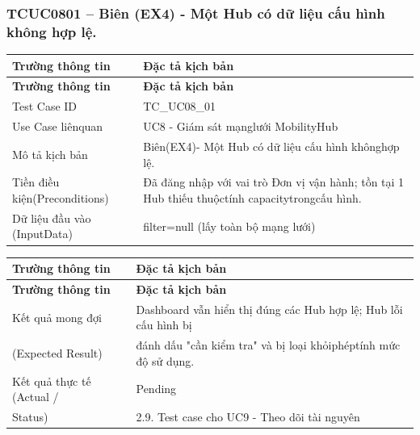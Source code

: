 \subsubsection{TCUC0801 – Biên (EX4) - Một Hub có dữ liệu cấu hình không hợp lệ.}
\begin{longtable}{|L{0.24\textwidth}|L{0.70\textwidth}|}
\hline
\textbf{Trường thông tin} & \textbf{Đặc tả kịch bản} \\
\hline
\endfirsthead
\hline
\textbf{Trường thông tin} & \textbf{Đặc tả kịch bản} \\
\hline
\endhead
Test Case ID & TC\_UC08\_01 \\
\hline
Use Case liênquan & UC8 - Giám sát mạnglưới MobilityHub \\
\hline
Mô tả kịch bản & Biên(EX4)- Một Hub có dữ liệu cấu hình khônghợp lệ. \\
\hline
Tiền điều kiện\newline (Preconditions) & Đã đăng nhập với vai trò Đơn vị vận hành; tồn tại 1 Hub thiếu thuộc\newline tính capacitytrongcấu hình. \\
\hline
Dữ liệu đầu vào (Input\newline Data) & filter=null (lấy toàn bộ mạng lưới) \\
\hline
\end{longtable}
\vspace{-0.5\baselineskip}
\begin{longtable}{|L{0.24\textwidth}|L{0.70\textwidth}|}
\hline
\textbf{Trường thông tin} & \textbf{Đặc tả kịch bản} \\
\hline
\endfirsthead
\hline
\textbf{Trường thông tin} & \textbf{Đặc tả kịch bản} \\
\hline
\endhead
Kết quả mong đợi & Dashboard vẫn hiển thị đúng các Hub hợp lệ; Hub lỗi cấu hình bị \\
\hline
(Expected Result) & đánh dấu "cần kiểm tra" và bị loại khỏiphéptính mức độ sử dụng. \\
\hline
Kết quả thực tế (Actual / & Pending \\
\hline
Status) & 2.9. Test case cho UC9 - Theo dõi tài nguyên \\
\hline
\end{longtable}
\vspace{-0.5\baselineskip}
